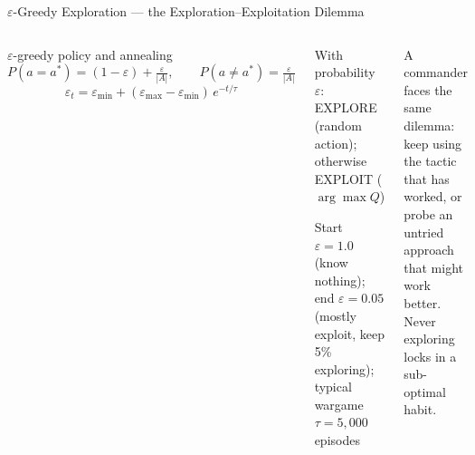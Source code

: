 \documentclass[aspectratio=169,10pt,t]{beamer}
\begin{document}
\begin{frame}{$\varepsilon$-Greedy Exploration --- the Exploration--Exploitation Dilemma}
\begin{columns}[T]
\begin{fbx}{$\varepsilon$-greedy policy and annealing}\[P(a=a^{*})=(1-\varepsilon)+\tfrac{\varepsilon}{|A|},\qquad P(a\ne a^{*})=\tfrac{\varepsilon}{|A|}\]\[\varepsilon_t=\varepsilon_{\min}+(\varepsilon_{\max}-\varepsilon_{\min})\,e^{-t/\tau}\]\end{fbx}
\begin{tl}\item With probability $\varepsilon$: EXPLORE (random action); otherwise EXPLOIT ($\arg\max Q$)\item Start $\varepsilon=1.0$ (know nothing); end $\varepsilon=0.05$ (mostly exploit, keep 5\% exploring); typical wargame $\tau=5{,}000$ episodes\end{tl}
\begin{ibox}\scriptsize A commander faces the same dilemma: keep using the tactic that has worked, or probe an untried approach that might work better. Never exploring locks in a sub-optimal habit.\end{ibox}
\end{columns}
\end{frame}
\end{document}
